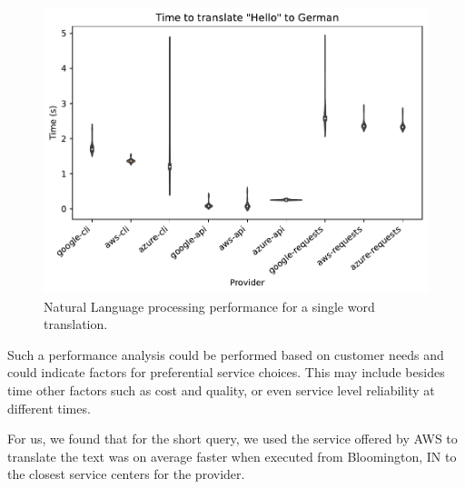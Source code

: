 \begin{figure}[htb]

\centering
\includegraphics[width=1.0\columnwidth]{images/nlp-benchmark.pdf}

\caption{Natural Language processing performance for a single
         word translation.}
\label{fig:nlp-performance}

\end{figure}


Such a performance analysis could be performed based on customer needs
and could indicate factors for preferential service choices. This may
include besides time other factors such as cost and quality, or even
service level reliability at different times.

For us, we found that for the short query, we used the service
offered by AWS to translate the text was on average 
faster when executed from Bloomington, IN to the closest service
centers for the provider.


